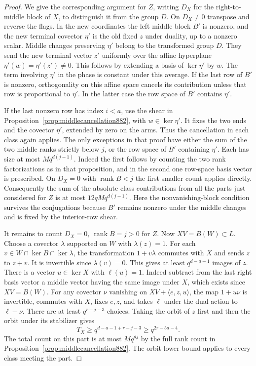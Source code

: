 \documentclass[a4paper,11pt]{article}
\theoremstyle{definition}
\theoremstyle{remark}
\numberwithin{equation}{section}
\begin{document}
\begin{proof}
We give the corresponding argument for \(Z\), writing \(D_X\)
for the right-to-middle block of \(X\), to distinguish it from
the group \(D\). On \(D_X\ne0\) transpose and reverse the flags.
In the new coordinates the left middle block \(B'\) is nonzero,
and the new terminal covector \(\eta'\) is the old fixed \(z\)
under duality, up to a nonzero scalar. Middle changes preserving
\(\eta'\) belong to the transformed group \(D\). They send the
new terminal vector \(z'\) uniformly over the affine hyperplane
\(\eta'(w)=\eta'(z')\ne0\). This follows by extending a basis of
\(\ker\eta'\) by \(w\). The term involving \(\eta'\) in the
phase is constant under this average. If the last row of \(B'\)
is nonzero, orthogonality on this affine space cancels its
contribution unless that row is proportional to \(\eta'\).
In the latter case the row space of \(B'\) contains \(\eta'\).

If the last nonzero row has index \(i<a\), use the shear in
Proposition~\ref{prop:middlecancellation882}, with \(w\in\ker\eta'\).
It fixes the two ends and the covector \(\eta'\), extended by
zero on the arms. Thus the cancellation in each class again applies.
The only exceptions in that proof have either the sum of the
two middle ranks strictly below \(j\), or the row space of \(B'\)
containing \(\eta'\). Each has size at most \(M q^{d(j-1)}\).
Indeed the first follows by counting the two rank factorizations
as in that proposition, and in the second one row-space basis
vector is prescribed. On \(D_X=0\) with \(\operatorname{rank}B<j\)
the first smaller count applies directly. Consequently the sum
of the absolute class contributions from all the parts just
considered for \(Z\) is at most \(12qM q^{d(j-1)}\).
Here the nonvanishing-block condition survives the conjugations
because \(B'\) remains nonzero under the middle changes and is
fixed by the interior-row shear.

It remains to count \(D_X=0,\ \operatorname{rank}B=j>0\) for
\(Z\). Now \(XV=B(W)\subset L\). Choose a covector \(\lambda\)
supported on \(W\) with \(\lambda(z)=1\). For each
\(v\in W\cap\ker B\cap\ker\lambda\), the transformation
\(1+v\lambda\) commutes with \(X\) and sends \(z\) to \(z+v\).
It is invertible since \(\lambda(v)=0\). This gives at least
\(q^{d-a-1}\) images of \(z\). There is a vector \(u\in\ker X\)
with \(\ell(u)=1\). Indeed subtract from the last right basis
vector a middle vector having the same image under \(X\), which
exists since \(XV=B(W)\). For any covector \(\nu\) vanishing on
\(XV+\langle e,z,u\rangle\), the map \(1+u\nu\) is invertible,
commutes with \(X\), fixes \(e,z\), and takes \(\ell\) under
the dual action to \(\ell-\nu\). There are at least
\(q^{r-j-3}\) choices. Taking the orbit of \(z\) first and
then the orbit under its stabilizer gives
\[
                 T_X\ge q^{d-a-1+r-j-3}\ge q^{2r-5a-4}.
\]
The total count on this part is at most \(M q^{dj}\) by the
full rank count in Proposition~\ref{prop:middlecancellation882}.
The orbit lower bound applies to every class meeting the part.


\end{proof}
\end{document}
